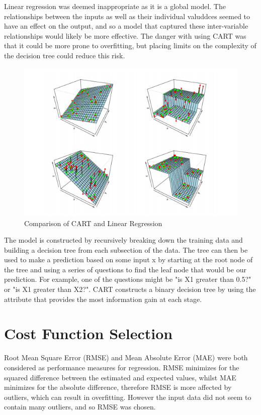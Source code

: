 \documentclass[12pt]{article}
\begin{document}
Linear regression was deemed inappropriate as it is a global model. The relationships between the inputs as well as their individual valuddces seemed to have an effect on the output, and so a model that captured these inter-variable relationships would likely be more effective. The danger with using CART was that it could be more prone to overfitting, but placing limits on the complexity of the decision tree could reduce this risk. 

\begin{figure}[!ht]
\centering
\includegraphics[width=0.8 \linewidth]{images/cartvslinear}
\caption{Comparison of CART and Linear Regression \cite{breiman}}
\label{fig:cartvslinear}
\end{figure}

The model is constructed by recursively breaking down the training data and building a decision tree from each subsection of the data. The tree can then be used to make a prediction based on some input x by starting at the root node of the tree and using a series of questions to find the leaf node that would be our prediction. For example, one of the questions might be "is X1 greater than 0.5?" or "is X1 greater than X2?". CART constructs a binary decision tree by using the attribute that provides the most information gain at each stage.

\section{Cost Function Selection}

Root Mean Square Error (RMSE) and Mean Absolute Error (MAE) were both considered as performance measures for regression. RMSE minimizes for the squared difference between the estimated and expected values, whilst MAE minimizes for the absolute difference, therefore RMSE is more affected by outliers, which can result in overfitting. However the input data did not seem to contain many outliers, and so RMSE was chosen.
\end{document}

